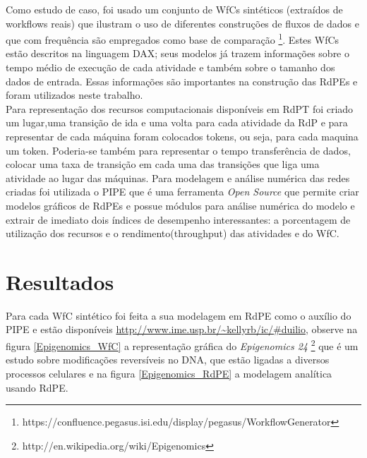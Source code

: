 \documentclass[a4paper,10pt]{article}
\begin{document}
	Como estudo de caso, foi usado um conjunto de WfCs sintéticos (extraídos de workflows reais) que ilustram o uso de diferentes construções de fluxos de dados e que com frequência são empregados como base de comparação \footnote{https://confluence.pegasus.isi.edu/display/pegasus/WorkflowGenerator}. Estes WfCs estão descritos na linguagem DAX; seus modelos já trazem informações sobre o tempo médio de execução de cada atividade e também sobre o tamanho dos dados de entrada. Essas informações são importantes na construção das RdPEs e foram utilizados neste trabalho.\\
	
	Para representação dos recursos computacionais disponíveis em RdPT foi criado um lugar,uma transição de ida e uma volta para cada atividade da RdP e para representar de cada máquina foram colocados tokens, ou seja, para cada maquina um token. Poderia-se também para representar o tempo transferência de dados, colocar uma taxa de transição em cada uma das transições que liga uma atividade ao lugar das máquinas. Para modelagem e análise numérica das redes criadas foi utilizada o PIPE que é uma ferramenta \textit{Open Source} que permite criar modelos gráficos de RdPEs e possue módulos para análise numérica do modelo e extrair de imediato dois índices de desempenho interessantes: a porcentagem de utilização dos recursos e o rendimento(throughput) das atividades e do WfC.
	
\section*{Resultados}
	Para cada WfC sintético foi feita a sua modelagem em RdPE como o auxílio do PIPE e estão disponíveis \url{http://www.ime.usp.br/~kellyrb/ic/#duilio}, observe na figura \ref{Epigenomics_WfC} a representação gráfica do \textit{Epigenomics 24} \footnote{http://en.wikipedia.org/wiki/Epigenomics} que é um estudo sobre modificações reversíveis no DNA, que estão ligadas a diversos processos celulares e na figura \ref{Epigenomics_RdPE} a modelagem analítica usando RdPE.
\end{document}
